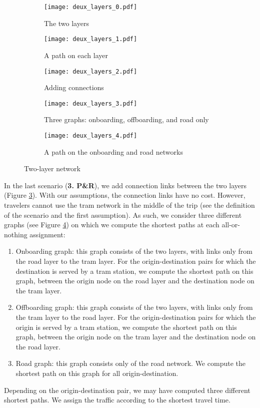 \begin{figure}
    \centering
    \begin{subfigure}{0.33\textwidth}
        \centering
        \texttt{[image: deux\_layers\_0.pdf]}
        \caption{The two layers}
        \label{fig:2layer_0}
    \end{subfigure}%
    \begin{subfigure}{0.33\textwidth}
        \centering
        \texttt{[image: deux\_layers\_1.pdf]}
        \caption{A path on each layer}
        \label{fig:2layer_1}
    \end{subfigure}
    \begin{subfigure}{0.33\textwidth}
        \centering
        \texttt{[image: deux\_layers\_2.pdf]}
        \caption{Adding connections\\}
        \label{fig:2layer_2}
    \end{subfigure}%
    \begin{subfigure}{0.33\textwidth}
        \centering
        \texttt{[image: deux\_layers\_3.pdf]}
        \caption{Three graphs: onboarding, offboarding, and road only
        \label{fig:2layer_3}}
    \end{subfigure}%
    \begin{subfigure}{0.33\textwidth}
        \centering
        \texttt{[image: deux\_layers\_4.pdf]}
        \caption{A path on the onboarding and road networks}
        \label{fig:2layer_4}
    \end{subfigure}%
    \caption{Two-layer network}
\end{figure}

In the last scenario (\textbf{3. P\&R}), we add connection links between the two layers (Figure \ref{fig:2layer_2}). With our assumptions, the connection links have no cost. However, travelers cannot use the tram network in the middle of the trip (see the definition of the scenario and the first assumption). As such, we consider three different graphs (see Figure \ref{fig:2layer_3}) on which we compute the shortest paths at each all-or-nothing assignment:
\begin{enumerate}
    \item Onboarding graph: this graph consists of the two layers, with links only from the road layer to the tram layer. For the origin-destination pairs for which the destination is served by a tram station, we compute the shortest path on this graph, between the origin node on the road layer and the destination node on the tram layer.
    \item Offboarding graph: this graph consists of the two layers, with links only from the tram layer to the road layer. For the origin-destination pairs for which the origin is served by a tram station, we compute the shortest path on this graph, between the origin node on the tram layer and the destination node on the road layer.
    \item Road graph: this graph consists only of the road network. We compute the shortest path on this graph for all origin-destination.
\end{enumerate}

Depending on the origin-destination pair, we may have computed three different shortest paths. We assign the traffic according to the shortest travel time.



